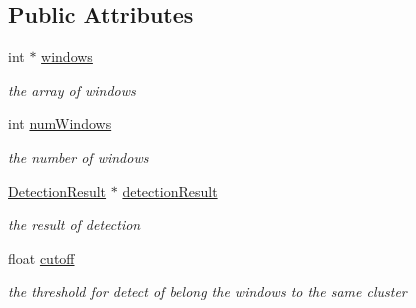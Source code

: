 \subsection*{Public Attributes}
\begin{DoxyCompactItemize}
\item 
int $\ast$ \hyperlink{classtld_1_1Clustering_acd1251895c2999f2041b50142cf81dda}{windows}
\begin{DoxyCompactList}\small\item\em the array of windows \end{DoxyCompactList}\item 
int \hyperlink{classtld_1_1Clustering_a25b3b82795ea06758b6a321f856f004b}{num\-Windows}
\begin{DoxyCompactList}\small\item\em the number of windows \end{DoxyCompactList}\item 
\hyperlink{classtld_1_1DetectionResult}{Detection\-Result} $\ast$ \hyperlink{classtld_1_1Clustering_abfc41de1f95b5c019676aa5f42d9e960}{detection\-Result}
\begin{DoxyCompactList}\small\item\em the result of detection \end{DoxyCompactList}\item 
float \hyperlink{classtld_1_1Clustering_ae5fcb2d589b404b081dad28977467707}{cutoff}
\begin{DoxyCompactList}\small\item\em the threshold for detect of belong the windows to the same cluster \end{DoxyCompactList}\end{DoxyCompactItemize}
